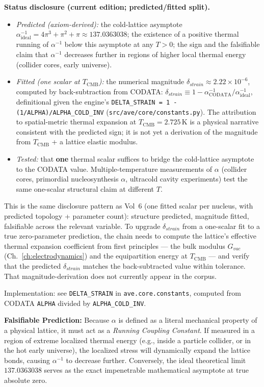 \noindent\textbf{Status disclosure (current edition; predicted/fitted split).}
\begin{itemize}
    \item \emph{Predicted (axiom-derived):} the cold-lattice asymptote $\alpha^{-1}_{\text{ideal}} = 4\pi^3 + \pi^2 + \pi \approx 137.0363038$; the existence of a positive thermal running of $\alpha^{-1}$ below this asymptote at any $T > 0$; the sign and the falsifiable claim that $\alpha^{-1}$ decreases further in regions of higher local thermal energy (collider cores, early universe).
    \item \emph{Fitted (one scalar at $T_{\text{CMB}}$):} the numerical magnitude $\delta_{strain} \approx 2.22\times 10^{-6}$, computed by back-subtraction from CODATA: $\delta_{strain} \equiv 1 - \alpha^{-1}_{\text{CODATA}}/\alpha^{-1}_{\text{ideal}}$, definitional given the engine's \texttt{DELTA\_STRAIN = 1 - (1/ALPHA)/ALPHA\_COLD\_INV} (\texttt{src/ave/core/constants.py}). The attribution to spatial-metric thermal expansion at $T_{\text{CMB}} = 2.725\,$K is a physical narrative consistent with the predicted sign; it is not yet a derivation of the magnitude from $T_{\text{CMB}}$ + a lattice elastic modulus.
    \item \emph{Tested:} that \textbf{one} thermal scalar suffices to bridge the cold-lattice asymptote to the CODATA value. Multiple-temperature measurements of $\alpha$ (collider cores, primordial nucleosynthesis $\alpha$, ultracold cavity experiments) test the same one-scalar structural claim at different $T$.
\end{itemize}
This is the same disclosure pattern as Vol~6 (one fitted scalar per nucleus, with predicted topology + parameter count): structure predicted, magnitude fitted, falsifiable across the relevant variable. To upgrade $\delta_{strain}$ from a one-scalar fit to a true zero-parameter prediction, the chain needs to compute the lattice's effective thermal expansion coefficient from first principles --- the bulk modulus $G_{vac}$ (Ch.~\ref{ch:electrodynamics}) and the equipartition energy at $T_{\text{CMB}}$ --- and verify that the predicted $\delta_{strain}$ matches the back-subtracted value within tolerance. That magnitude-derivation does not currently appear in the corpus.

Implementation: see \texttt{DELTA\_STRAIN} in \texttt{ave.core.constants}, computed from CODATA \texttt{ALPHA} divided by \texttt{ALPHA\_COLD\_INV}.

\textbf{Falsifiable Prediction:} Because $\alpha$ is defined as a literal mechanical property of a physical lattice, it must act as a \textit{Running Coupling Constant}. If measured in a region of extreme localized thermal energy (e.g., inside a particle collider, or in the hot early universe), the localized stress will dynamically expand the lattice bonds, causing $\alpha^{-1}$ to decrease further. Conversely, the ideal theoretical limit $137.0363038$ serves as the exact impenetrable mathematical asymptote at true absolute zero.

